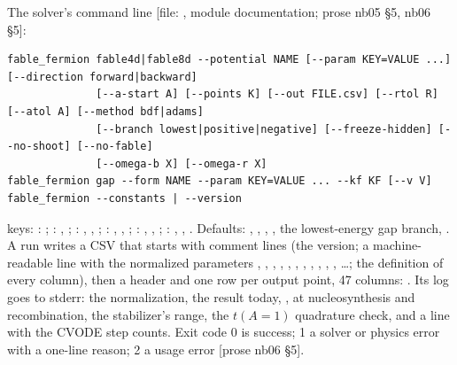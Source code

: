 The solver's command line [file: , module documentation;
prose nb05 \S5, nb06 \S5]:
\begin{Verbatim}[fontsize=\scriptsize]
fable_fermion fable4d|fable8d --potential NAME [--param KEY=VALUE ...] [--direction forward|backward]
              [--a-start A] [--points K] [--out FILE.csv] [--rtol R] [--atol A] [--method bdf|adams]
              [--branch lowest|positive|negative] [--freeze-hidden] [--no-shoot] [--no-fable]
              [--omega-b X] [--omega-r X]
fable_fermion gap --form NAME --param KEY=VALUE ... --kf KF [--v V]
fable_fermion --constants | --version
\end{Verbatim}
 keys: : ; : , ;
: , , ; : ,
, ; : , , ;
: , , . Defaults: ,
, , , the lowest-energy gap branch,
. A run writes a CSV that starts with \cfL{\#} comment lines (the version; a
machine-readable  line with the normalized parameters , , ,
, , , , , , ,
, \dots; the definition of every column), then a header and one row per output point, 47
columns:
.
Its log goes to stderr: the normalization, the result today, ,  at
nucleosynthesis and recombination, the stabilizer's range, the $t(A=1)$ quadrature check, and a
 line with the CVODE step counts. Exit code 0 is success; 1 a solver or physics error with a
one-line reason; 2 a usage error [prose nb06 \S5].

